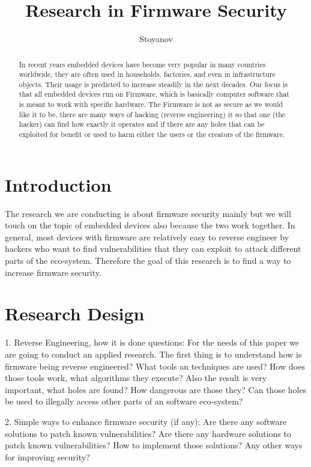 \documentclass[]{report}
\title{Research in Firmware Security}
\author{Stoyanov}
\begin{document}
\maketitle

\begin{abstract}
	In recent years embedded devices have become very popular in many countries worldwide, they are often used in households, factories, and even in infrastructure objects. Their usage is predicted to increase steadily in the next decades. Our focus is that all embedded devices run on Firmware, which is basically computer software that is meant to work with specific hardware. The Firmware is not as secure as we would like it to be, there are many ways of hacking (reverse engineering) it so that one (the hacker) can find how exactly it operates and if there are any holes that can be exploited for benefit or used to harm either the users or the creators of the firmware.
\end{abstract}

\section{Introduction}
The research we are conducting is about firmware security mainly but we will touch on the topic of embedded devices also because the two work together. In general, most devices with firmware are relatively easy to reverse engineer by hackers who want to find vulnerabilities that they can exploit to attack different parts of the eco-system. Therefore the goal of this research is to find a way to increase firmware security.
\section{Research Design}
1. Reverse Engineering, how it is done questions: For the needs of this paper we are going to conduct an applied research. The first thing is to understand how is firmware being reverse engineered? What tools an techniques are used? How does those tools work, what algorithms they execute? Also the result is very important, what holes are found? How dangerous are those they? Can those holes be used to illegally access other parts of an software eco-system?

2. Simple ways to enhance firmware security (if any):
Are there any software solutions to patch known vulnerabilities?
Are there any hardware solutions to patch known vulnerabilities?
How to implement those solutions?
Any other ways for improving security?
\end{document}
